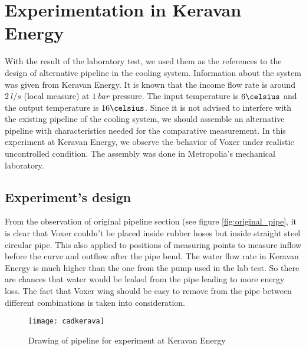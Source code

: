 \section{Experimentation in Keravan Energy}

With the result of the laboratory test, we used them as the references to the design of alternative pipeline in the cooling system. Information about the system was given from Keravan Energy. It is known that the income flow rate is around $2\ l/s$ (local measure) at $1\ bar$ pressure. The input temperature is $6\celsius$  and the output temperature is $16\celsius$. 
Since it is not advised to interfere with the existing pipeline of the cooling system, we should assemble an alternative pipeline with characteristics needed for the comparative measurement. In this experiment at Keravan Energy, we observe the behavior of Voxer under realistic uncontrolled condition. The assembly was done in Metropolia's mechanical laboratory.  

\subsection{Experiment's design}

From the observation of original pipeline section (see figure \vref{fig:original_pipe}, it is clear that Voxer couldn't be placed inside rubber hoses but inside straight steel circular pipe. This also applied to positions of measuring points to measure inflow before the curve and outflow after the pipe bend. The water flow rate in Keravan Energy is much higher than the one from the pump used in the lab test. So there are chances that water would be leaked from the pipe leading to more energy loss. The fact that Voxer wing should be easy to remove from the pipe between different combinations  is taken into consideration.

\begin{figure}[h]
  \centering
  \texttt{[image: cadkerava]}
  \caption{ Drawing of pipeline for experiment at Keravan Energy}
  \label{fig:cadkerava}
\end{figure}

